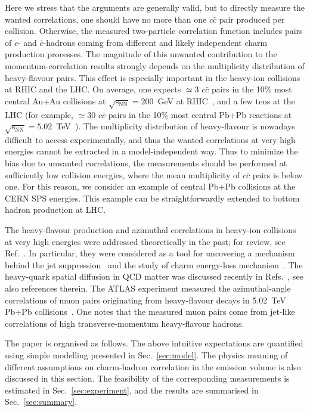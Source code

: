 \documentclass[floatfix,superscriptaddress,a4paper,
               showpieces,showkeys,nofootinbib,preprint]{revtex4-2}
\begin{document}
Here we stress that the arguments are generally valid, but to directly measure the wanted correlations, one should have no more than one $c\bar{c}$ pair produced per collision. Otherwise, the measured two-particle correlation function includes pairs of $c$- and $\bar{c}$-hadrons 
coming from different and likely independent charm production processes.
The magnitude of this unwanted contribution to the momentum-correlation results strongly depends on the multiplicity distribution of heavy-flavour pairs. This effect is especially important in the heavy-ion collisions at RHIC and the LHC. On average, one expects $\simeq3$ $c\bar{c}$ pairs in the 10\% most central Au+Au collisions at $\mathrm{\sqrt{s_{NN}} = 200}$~GeV at RHIC~\cite{STAR:2018zdy,STAR:2012nbd}, and a few tens at the LHC (for example, $\simeq 30$ $c\bar{c}$ pairs in the 10\% most central Pb+Pb reactions at $\mathrm{\sqrt{s_{NN}} = 5.02}$~TeV~\cite{ALICE:2021dhb,ALICE:2021rxa}). The
multiplicity distribution of heavy-flavour is nowadays difficult to access experimentally, and thus the wanted correlations at very high energies cannot be extracted in a model-independent way. Thus to minimize the bias due to unwanted correlations, the measurements should be performed at sufficiently low collision energies, where the mean multiplicity of  $c\bar{c}$ pairs is below one.
For this reason, we consider an example of central Pb+Pb collisions at the
CERN SPS energies. 
This example can be straightforwardly extended to bottom hadron production at LHC.


The heavy-flavour production and azimuthal correlations in heavy-ion collisions at very high energies were addressed theoretically in the past; for review, see Ref.~\cite{Andronic:2015wma}. In particular, they were considered as a tool for uncovering a mechanism behind the jet suppression~\cite{Attems:2022ubu,Attems:2022otp} and the study of charm energy-loss 
mechanism~\cite{Rohrmoser:2017vsa,PhysRevC.90.024907,Wang:2019vhg,Wang:2021xpv}.
The heavy-quark spatial diffusion in QCD matter was discussed recently in 
Refs.~\cite{Sambataro:2020pge,Capellino:2022nvf,Satapathy:2022xdw}, see also references therein.
The ATLAS experiment measured the azimuthal-angle correlations of muon pairs originating from heavy-flavour decays in 5.02~TeV Pb+Pb collisions~\cite{ATLAS:2022mhn}. One notes that the measured 
muon pairs come from jet-like correlations of high transverse-momentum heavy-flavour hadrons. 



The paper is organised as follows.
The above intuitive expectations are quantified using simple modelling presented in Sec.~\ref{sec:model}. The physics meaning of different assumptions on charm-hadron correlation in the emission volume is also discussed in this section. The feasibility of the corresponding measurements is estimated in Sec.~\ref{sec:experiment}, and the results are summarised in Sec.~\ref{sec:summary}.
\end{document}
